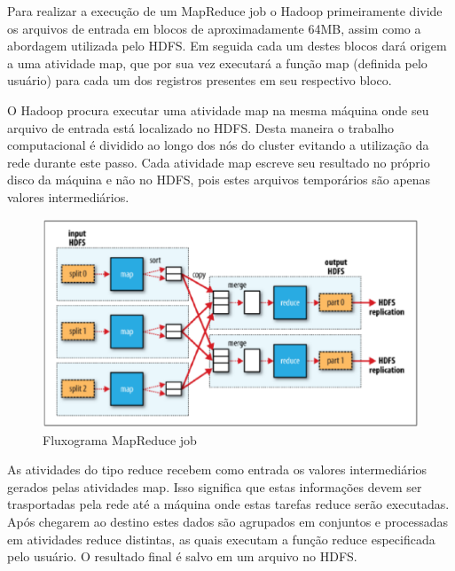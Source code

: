 Para realizar a execução de um MapReduce job o Hadoop primeiramente divide os arquivos de entrada em blocos de aproximadamente 64MB, assim como a abordagem utilizada pelo HDFS. Em seguida cada um destes blocos dará origem a uma atividade map, que por sua vez executará a função map (definida pelo usuário) para cada um dos registros presentes em seu respectivo bloco. 

O Hadoop procura executar uma atividade map na mesma máquina onde seu arquivo de entrada está localizado no HDFS. Desta maneira o trabalho computacional é dividido ao longo dos nós do cluster evitando a utilização da rede durante este passo. Cada atividade map escreve seu resultado no próprio disco da máquina e não no HDFS, pois estes arquivos temporários são apenas valores intermediários.

\begin{figure}[h!]
	\centering
	\includegraphics[keepaspectratio=true,scale=0.45]
	  {figuras/mapreduce-job.eps}
	\caption{Fluxograma MapReduce job}
	\label{fig-mapreduce-job}
\end{figure}

As atividades do tipo reduce recebem como entrada os valores intermediários gerados pelas atividades map. Isso significa que estas informações devem ser trasportadas pela rede até a máquina onde estas tarefas reduce serão executadas. Após chegarem ao destino estes dados são agrupados em conjuntos e processadas em atividades reduce distintas, as quais executam a função reduce especificada pelo usuário. O resultado final é salvo em um arquivo no HDFS.


